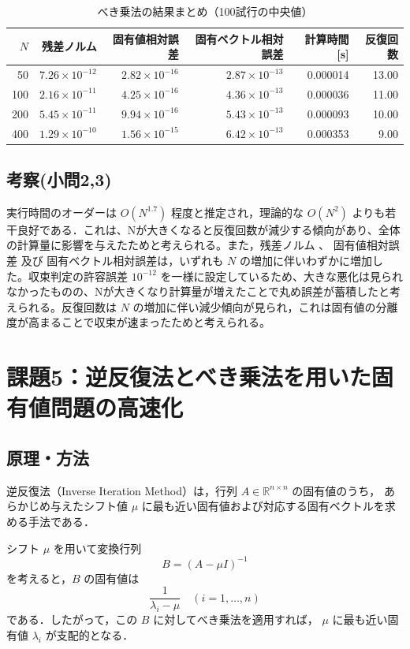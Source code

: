 \documentclass[a4paper,11pt]{ltjsarticle}
\begin{document}
\begin{table}[H]
\centering
\caption{べき乗法の結果まとめ（100試行の中央値）}
\label{tab:exp3_summary}
\begin{tabular}{r|r|r|r|r|r}
\hline
$N$ & 残差ノルム & 固有値相対誤差 & 固有ベクトル相対誤差 & 計算時間 [s] & 反復回数 \\
\hline
50  & $7.26\times10^{-12}$ & $2.82\times10^{-16}$ & $2.87\times10^{-13}$ & 0.000014 & 13.00 \\
100 & $2.16\times10^{-11}$ & $4.25\times10^{-16}$ & $4.36\times10^{-13}$ & 0.000036 & 11.00 \\
200 & $5.45\times10^{-11}$ & $9.94\times10^{-16}$ & $5.43\times10^{-13}$ & 0.000093 & 10.00 \\
400 & $1.29\times10^{-10}$ & $1.56\times10^{-15}$ & $6.42\times10^{-13}$ & 0.000353 & 9.00 \\
\hline
\end{tabular}
\end{table}


\subsection{考察(小問2,3)}
実行時間のオーダーは $O(N^1.7)$ 程度と推定され，理論的な $O(N^2)$ よりも若干良好である．これは、Nが大きくなると反復回数が減少する傾向があり、全体の計算量に影響を与えたためと考えられる。また，残差ノルム 、 固有値相対誤差 及び 固有ベクトル相対誤差は，いずれも $N$ の増加に伴いわずかに増加した。収束判定の許容誤差 $10^{-12}$ を一様に設定しているため、大きな悪化は見られなかったものの、Nが大きくなり計算量が増えたことで丸め誤差が蓄積したと考えられる。反復回数は $N$ の増加に伴い減少傾向が見られ，これは固有値の分離度が高まることで収束が速まったためと考えられる。

\section{課題5：逆反復法とべき乗法を用いた固有値問題の高速化}
\subsection{原理・方法}

逆反復法（Inverse Iteration Method）は，行列 $A \in \mathbb{R}^{n\times n}$ の固有値のうち，
あらかじめ与えたシフト値 $\mu$ に最も近い固有値および対応する固有ベクトルを求める手法である\cite{exp2025}．

シフト $\mu$ を用いて変換行列
\[
B = (A - \mu I)^{-1}
\]
を考えると，$B$ の固有値は
\[
\frac{1}{\lambda_{i} - \mu} \quad (i = 1, \ldots, n)
\]
である．したがって，この $B$ に対してべき乗法を適用すれば，
$\mu$ に最も近い固有値 $\lambda_{i}$ が支配的となる．
\end{document}
